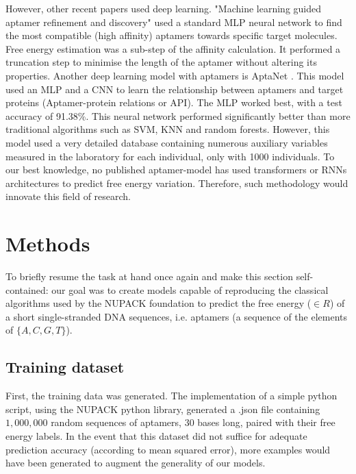 \documentclass[11pt]{article}
\begin{document}
However, other recent papers used deep learning. "Machine learning guided aptamer refinement and discovery" \cite{bashir2021machine} 
used a standard MLP neural network to find the most compatible (high affinity) aptamers towards specific target molecules. Free energy estimation was a sub-step of the affinity calculation. It performed a 
truncation step to minimise the length of the aptamer without altering its properties. 
Another deep learning model with aptamers is AptaNet 
\cite{emami2021aptanet}. This model used an MLP and a CNN to learn the relationship between aptamers and target proteins (Aptamer-protein relations or API). The MLP worked best, with a test accuracy of 91.38\%. This neural network performed significantly better than more traditional algorithms such as SVM, KNN and random forests. However, this model 
used a very detailed database containing numerous auxiliary variables 
measured in the laboratory for each individual, only with 1000 individuals. 
To our best knowledge, no published aptamer-model has used transformers or RNNs architectures to predict free energy variation. Therefore, such methodology would innovate this field of research.

\section{Methods}
To briefly resume the task at hand once again and make this section
self-contained: our goal was to create models capable of reproducing 
the classical algorithms used by the NUPACK foundation to predict the 
free energy ($\in R$) of a short single-stranded DNA sequences, i.e. aptamers (a sequence of the elements of $\{A,C,G,T\}$).
\subsection{Training dataset}
First, the training data was generated. The implementation of a 
simple python script, using the NUPACK python library, generated a .json file containing $1,000,000$ random sequences of aptamers, 30 bases long, paired with their free energy labels. In the event that this dataset did not
suffice for adequate prediction accuracy (according to mean squared error), more examples would have been generated to augment the generality of our models.
\end{document}
